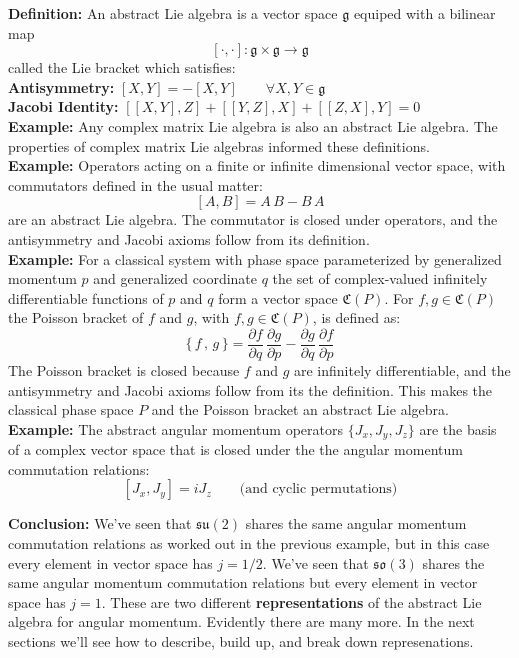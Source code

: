 \documentclass[12pt]{article}
\begin{document}
\noindent
{\bf Definition:} An abstract Lie algebra is a vector space
$\mathfrak{g}$ equiped with a bilinear map
$$[\cdot,\cdot]:\mathfrak{g} \times \mathfrak{g} \to \mathfrak{g}$$
called the Lie bracket which satisfies:\\[5pt]
{\bf Antisymmetry:} $[X,Y] = -[X,Y] \quad \quad \forall X,Y \in \mathfrak{g}$\\[5pt]
{\bf Jacobi Identity:} $[[X,Y],Z] + [[Y,Z],X] + [[Z,X],Y] = 0$\\[5pt]

\noindent
{\bf Example:} Any complex matrix Lie algebra is also an abstract Lie
algebra.  The properties of complex matrix Lie algebras informed these
definitions.\\[5pt]

\noindent
{\bf Example:} Operators acting on a finite or infinite dimensional
vector space, with commutators defined in the usual matter:
$$[A,B] = A\,B - B\,A$$
are an abstract Lie algebra.  The commutator is closed under operators, and the antisymmetry and Jacobi axioms follow from its definition.\\[5pt]

\noindent
{\bf Example:} For a classical system with phase space parameterized
by generalized momentum $p$ and generalized coordinate $q$ the set of
complex-valued infinitely differentiable functions of $p$ and $q$ form
a vector space $\mathfrak{C}(P)$.  For $f,g \in \mathfrak{C}(P)$ the
Poisson bracket of $f$ and $g$, with $f,g \in \mathfrak{C}(P)$, is
defined as:
$$\{\,f\,,\,g\,\} = \frac{\partial f}{\partial q} \, \frac{\partial
  g}{\partial p} - \frac{\partial g}{\partial q} \, \frac{\partial
  f}{\partial p}$$
The Poisson bracket is closed because $f$ and $g$ are infinitely
differentiable, and the antisymmetry and Jacobi axioms follow from its
the definition.  This makes the classical phase space $P$ and the
Poisson bracket an abstract Lie algebra.\\[5pt]

\noindent
{\bf Example:} The abstract angular momentum operators $\{J_x, J_y,
J_z\}$ are the basis of a complex vector space that is closed under the 
the angular momentum commutation relations:
$$[J_x,J_y] = iJ_z \quad \quad \text{(and cyclic permutations)}$$

\noindent
{\bf Conclusion:} We've seen that $\mathfrak{su}(2)$ shares the same
angular momentum commutation relations as worked out in the previous
example, but in this case every element in vector space has $j=1/2$.
We've seen that $\mathfrak{so}(3)$ shares the same angular momentum
commutation relations but every element in vector space has $j=1$.
These are two different {\bf representations} of the abstract Lie
algebra for angular momentum.  Evidently there are many more.  In the
next sections we'll see how to describe, build up, and break down
represenations.
\end{document}
